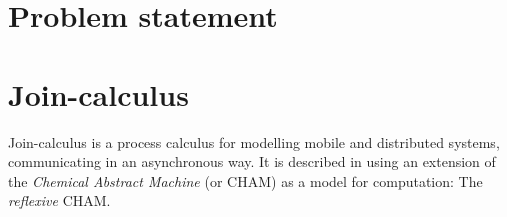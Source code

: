 \section{Problem statement}

\section{Join-calculus}

Join-calculus is a process calculus for modelling mobile and distributed
systems, communicating in an asynchronous way. It is described in
\cite{fournet1996reflexive} using an extension of the \emph{Chemical Abstract
Machine}\cite{berry1989chemical} (or CHAM) as a model for computation: The
\emph{reflexive} CHAM.
